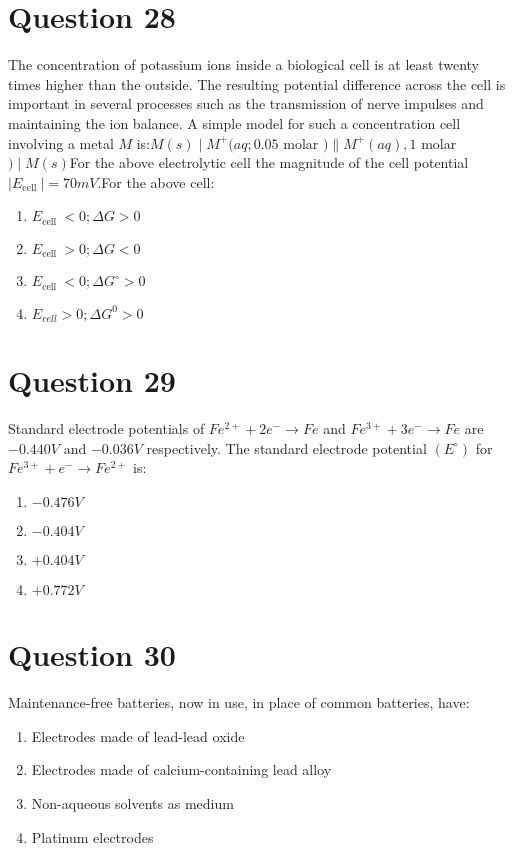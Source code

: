 \documentclass{article}
\begin{document}
\section*{Question 28}
The concentration of potassium ions inside a biological cell is at least twenty times higher than the outside. The resulting potential difference across the cell is important in several processes such as the transmission of nerve impulses and maintaining the ion balance. A simple model for such a concentration cell involving a metal \(M\) is:\(M ( s ) \mid M ^{+}( aq ; 0.05\) molar \() \| M ^{+}( aq ), 1\) molar \() \mid M ( s )\)For the above electrolytic cell the magnitude of the cell potential \(\left| E _{\text {cell }}\right|=70 mV\).For the above cell:
\begin{enumerate}[label=(\alph*)]
\item \(E _{\text {cell }}<0 ; \Delta G >0\)
\item \(E _{\text {cell }}>0 ; \Delta G <0\)
\item \(E_{\text {cell }}<0 ; \Delta G ^{\circ}>0\)
\item \(E _{ cell }>0 ; \Delta G ^0>0\)
\end{enumerate}
\newpage
\section*{Question 29}
Standard electrode potentials of \(Fe ^{2+}+2 e ^{-} \rightarrow Fe\) and \(Fe ^{3+}+3 e ^{-} \rightarrow Fe\) are \(-0.440 V\) and \(-0.036 V\) respectively. The standard electrode potential \(\left( E ^{\circ}\right)\) for \(Fe ^{3+}+ e ^{-} \rightarrow Fe ^{2+}\) is:
\begin{enumerate}[label=(\alph*)]
\item \(-0.476 V\)
\item \(-0.404 V\)
\item \(+0.404 V\)
\item \(+0.772 V\)
\end{enumerate}
\newpage
\section*{Question 30}
Maintenance-free batteries, now in use, in place of common batteries, have:
\begin{enumerate}[label=(\alph*)]
\item Electrodes made of lead-lead oxide
\item Electrodes made of calcium-containing lead alloy
\item Non-aqueous solvents as medium
\item Platinum electrodes
\end{enumerate}
\newpage
\end{document}
